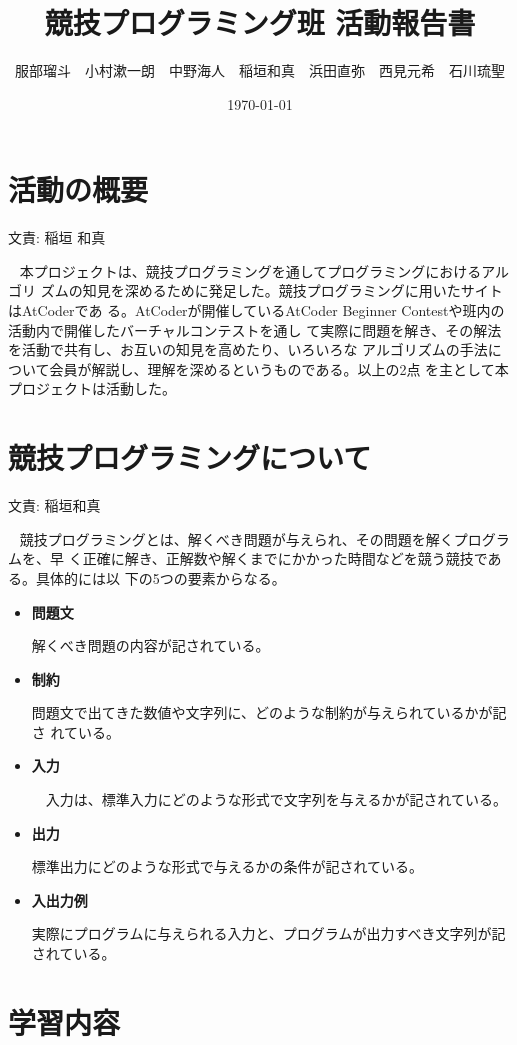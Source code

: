\documentclass[11pt,a4paper]{jsarticle}
\title{競技プログラミング班 活動報告書}
\author{服部瑠斗　小村漱一朗　中野海人　稲垣和真　浜田直弥　西見元希　石川琉聖}
\date{\today}
\newcommand{\writtenBy}[1]{\begin{flushright}文責: #1\end{flushright}~}
\begin{document}
\maketitle
%
%
\section{活動の概要}
\writtenBy{稲垣 和真}
本プロジェクトは、競技プログラミングを通してプログラミングにおけるアルゴリ
ズムの知見を深めるために発足した。競技プログラミングに用いたサイトはAtCoderであ
る。AtCoderが開催しているAtCoder Beginner Contestや班内の活動内で開催したバーチャルコンテストを通し
て実際に問題を解き、その解法を活動で共有し、お互いの知見を高めたり、いろいろな
アルゴリズムの手法について会員が解説し、理解を深めるというものである。以上の2点
を主として本プロジェクトは活動した。

\section{競技プログラミングについて}
\writtenBy{稲垣和真}
競技プログラミングとは、解くべき問題が与えられ、その問題を解くプログラムを、早
く正確に解き、正解数や解くまでにかかった時間などを競う競技である。具体的には以
下の5つの要素からなる。
\begin{itemize}
    \item {\bf 問題文}
        \par
        解くべき問題の内容が記されている。
        \par
    \item {\bf 制約}
        \par
        問題文で出てきた数値や文字列に、どのような制約が与えられているかが記さ
        れている。
    \par
    \item {\bf 入力}
        \par
        　入力は、標準入力にどのような形式で文字列を与えるかが記されている。
    \par
    \item {\bf 出力}
        \par
        標準出力にどのような形式で与えるかの条件が記されている。
    \par
    \item {\bf 入出力例}
        \par
        実際にプログラムに与えられる入力と、プログラムが出力すべき文字列が記されている。
\end{itemize}
\section{学習内容}
\end{document}
